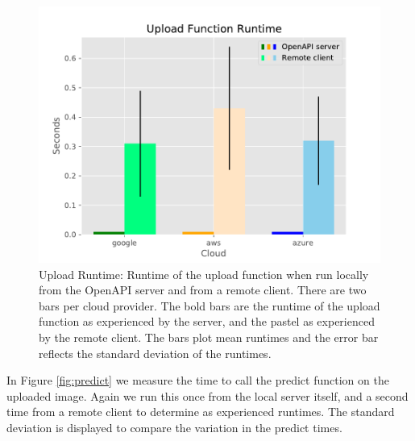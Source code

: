 \begin{figure}
\centering

\includegraphics[width=\columnwidth]{images/sample_graph_3.pdf}

\caption{Upload Runtime: Runtime of the upload function when run locally from
the OpenAPI server and from a remote client. There are two bars per
cloud provider. The bold bars are the runtime of the upload function as
experienced by the server, and the pastel as experienced by the remote
client. The bars plot mean runtimes and the error bar reflects the
standard deviation of the runtimes.}
\label{fig:upload}
\end{figure}


In Figure \ref{fig:predict} we measure the time to call the predict function on the
uploaded image. Again we run this once from the local server itself, and
a second time from a remote client to determine as experienced runtimes.
The standard deviation is displayed to compare the variation in the
predict times.


